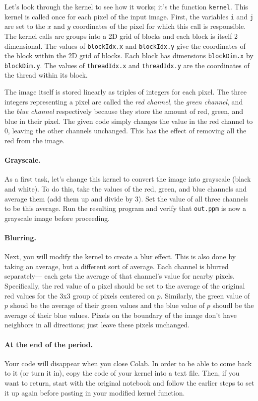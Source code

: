 \documentclass{article}
\begin{document}
Let's look through the kernel to see how it works; it's the function
{\tt kernel}.
This kernel is called once for each pixel of the input image.
First, the variables {\tt i} and {\tt j} are set to the $x$ and $y$
coordinates of the pixel for which this call is
responsible.
The kernel calls are groups into a 2D grid of blocks and each block
is itself 2 dimensional.
The values of {\tt blockIdx.x} and {\tt blockIdx.y} give the
coordinates of the block within the 2D grid of blocks.
Each block has dimensions {\tt blockDim.x} by {\tt blockDim.y}.
The values of {\tt threadIdx.x} and {\tt threadIdx.y} are the
coordinates of the thread within its block. 

The image itself is stored linearly as triples of integers for each
pixel.
The three integers representing a pixel are called the {\em red channel}, the
{\em green channel}, and the {\em blue channel} respectively because
they store the amount of red, green, and blue in their pixel.
The given code simply changes the value in the red channel to 0,
leaving the other channels unchanged.
This has the effect of removing all the red from the image. 

\paragraph{Grayscale.}
As a first task, let's change this kernel to convert the image into
grayscale (black and white).
To do this, take the values of the red, green, and blue channels and
average them (add them up and divide by 3).
Set the value of all three channels to be this average.
Run the resulting program and verify that {\tt out.ppm} is now a
grayscale image before proceeding.

\paragraph{Blurring.}
Next, you will modify the kernel to create a blur effect.
This is also done by taking an average, but a different sort of average.
Each channel is blurred separately--- each gets the average of that
channel’s value for nearby pixels.
Specifically, the red value of a pixel should be set to the average of
the original red values for the 3x3 group of pixels centered on $p$.
Similarly, the green value of $p$ shoud be the average of their green
values and the blue value of $p$ shoudl be the average of their blue
values.
Pixels on the boundary of the image don't have neighbors in all
directions; just leave these pixels unchanged.

\paragraph{At the end of the period.}
Your code will disappear when you close Colab.
In order to be able to come back to it (or turn it in), copy the code
of your kernel into a text file.
Then, if you want to return, start with the original notebook and
follow the earlier steps to set it up again before pasting in your
modified kernel function. 
\end{document}
